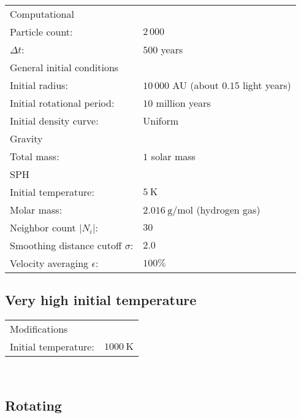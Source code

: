 \documentclass[../main.tex]{subfiles}
\begin{document}
\begin{tabular}{ll}

\multicolumn{2}{l}{Computational} \\
    \qquad Particle count:                     & $2 \, 000$ \\
    \qquad $\Delta t$:                         & $500$ years \\
\multicolumn{2}{l}{General initial conditions} \\
    \qquad Initial radius:                     & $10 \, 000$ AU (about $0.15$ light years)\\
    \qquad Initial rotational period:          & $10$ million years \\
    \qquad Initial density curve:              & Uniform \\
\multicolumn{2}{l}{Gravity} \\
    \qquad Total mass:                         & $1$ solar mass \\
\multicolumn{2}{l}{SPH} \\
    \qquad Initial temperature:                & $\SI{5}{\kelvin}$ \\
    \qquad Molar mass:                         & $\SI{2.016}{\gram\per\mole}$ (hydrogen gas) \\
    \qquad Neighbor count $|N_i|$:             & $30$ \\
    \qquad Smoothing distance cutoff $\sigma$:        & $2.0$ \\
    \qquad Velocity averaging $\epsilon$:      & $100\%$ \\

\end{tabular}

\subsection{Very high initial temperature}

\begin{tabular}{ll}
\multicolumn{2}{l}{Modifications} \\
\qquad Initial temperature:                    & $\SI{1000}{\kelvin}$ \\
\end{tabular}
\\

\subsection{Rotating}
\end{document}
